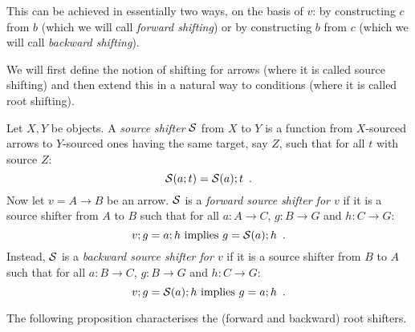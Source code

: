 This can be achieved in essentially two ways, on the basis of $v$: by constructing $c$ from $b$ (which we will call \emph{forward shifting}) or by constructing $b$ from $c$ (which we will call \emph{backward shifting}).

We will first define the notion of shifting for arrows (where it is called source shifting) and then extend this in a natural way to conditions (where it is called root shifting).

\begin{definition}
Let $X,Y$ be objects. A \emph{source shifter} $\mathcal{S}$ from $X$ to $Y$ is a function from $X$-sourced arrows to $Y$-sourced ones having the same target, say $Z$, such that for all $t$ with source $Z$:
%
\begin{equation}\eqlabel{shifters are functors}
\cS(a;t) = \cS(a);t \enspace.
\end{equation}
%
Now let $v=A\to B$ be an arrow. $\mathcal{S}$ is a \emph{forward source shifter for $v$} if it  is a source shifter from $A$ to $B$ such that for all $a:A\to C$, $g:B\to G$ and $h:C\to G$:
%
\begin{equation}\eqlabel{forward condition}
v;g = a;h \text{ implies } g = \cS(a);h \enspace.
\end{equation}
%
Instead, $\mathcal{S}$ is a \emph{backward source shifter for $v$} if it is a source shifter from $B$ to $A$ such that for all $a:B\to C$, $g:B\to G$ and $h:C\to G$:
%
\begin{equation}\eqlabel{backward condition}
v;g = \cS(a);h \text{ implies } g = a;h \enspace.
\end{equation}
\end{definition}
%
The following proposition characterises the (forward and backward) root shifters. 
%
